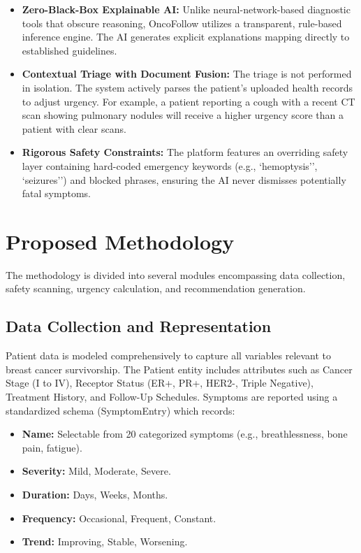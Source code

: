 \documentclass[10pt,journal,compsoc]{IEEEtran}
\begin{document}
\begin{itemize}
    \item \textbf{Zero-Black-Box Explainable AI:} Unlike neural-network-based diagnostic tools that obscure reasoning, OncoFollow utilizes a transparent, rule-based inference engine. The AI generates explicit explanations mapping directly to established guidelines.
    \item \textbf{Contextual Triage with Document Fusion:} The triage is not performed in isolation. The system actively parses the patient's uploaded health records to adjust urgency. For example, a patient reporting a cough with a recent CT scan showing pulmonary nodules will receive a higher urgency score than a patient with clear scans.
    \item \textbf{Rigorous Safety Constraints:} The platform features an overriding safety layer containing hard-coded emergency keywords (e.g., `hemoptysis'', `seizures'') and blocked phrases, ensuring the AI never dismisses potentially fatal symptoms.
\end{itemize}

\section{Proposed Methodology}
The methodology is divided into several modules encompassing data collection, safety scanning, urgency calculation, and recommendation generation.

\subsection{Data Collection and Representation}
Patient data is modeled comprehensively to capture all variables relevant to breast cancer survivorship. The Patient entity includes attributes such as Cancer Stage (I to IV), Receptor Status (ER+, PR+, HER2-, Triple Negative), Treatment History, and Follow-Up Schedules.
Symptoms are reported using a standardized schema (SymptomEntry) which records:
\begin{itemize}
    \item \textbf{Name:} Selectable from 20 categorized symptoms (e.g., breathlessness, bone pain, fatigue).
    \item \textbf{Severity:} Mild, Moderate, Severe.
    \item \textbf{Duration:} Days, Weeks, Months.
    \item \textbf{Frequency:} Occasional, Frequent, Constant.
    \item \textbf{Trend:} Improving, Stable, Worsening.
\end{itemize}
\end{document}

